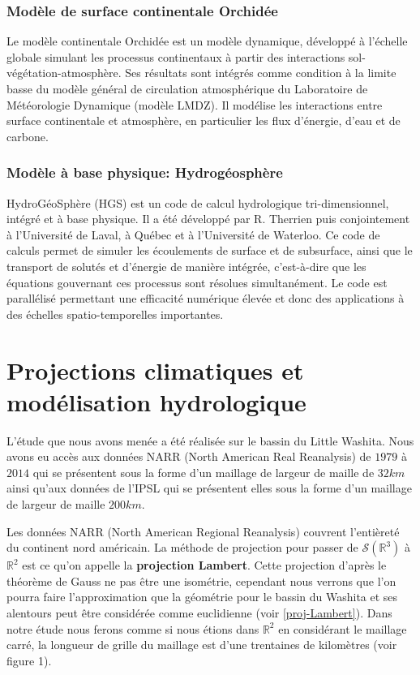 \documentclass[a4paper,11pt]{article}
\begin{document}
\subsubsection{Modèle de surface continentale Orchidée}

Le modèle continentale Orchidée est un modèle dynamique, développé à l’échelle globale simulant les processus continentaux à partir des interactions sol-végétation-atmosphère. Ses résultats sont intégrés comme condition à la limite basse du modèle général de circulation atmosphérique du Laboratoire de Météorologie Dynamique (modèle LMDZ). Il modélise les interactions entre surface continentale et atmosphère, en particulier les flux d'énergie, d'eau et de carbone. 



\subsubsection{Modèle à base physique: Hydrogéosphère}

HydroGéoSphère (HGS) est un code de calcul hydrologique tri-dimensionnel, intégré et à base physique. Il a été développé par R. Therrien puis conjointement à l’Université de Laval, à Québec et à l’Université de Waterloo. Ce code de calculs permet de simuler les écoulements de surface et de subsurface, ainsi que le transport de solutés et d’énergie de manière intégrée, c’est-à-dire que les équations gouvernant ces processus sont résolues simultanément. Le code est parallélisé permettant une efficacité numérique élevée et donc des applications à des échelles spatio-temporelles importantes.



\section{Projections climatiques et modélisation hydrologique}
\label{ch-pred-cli}
L'étude que nous avons menée a été réalisée sur le bassin du Little Washita. Nous avons eu accès aux données NARR (North American Real Reanalysis) de $1979$ à $2014$ qui se présentent sous la forme d'un maillage de largeur de maille de $32 km$ ainsi qu'aux données de l'IPSL qui se présentent elles sous la forme d'un maillage de largeur de maille $200 km$.

Les données NARR (North American Regional Reanalysis) couvrent l'entièreté du continent nord américain. La méthode de projection pour passer de $\mathcal{S}(\mathbb{R}^3)$ à $\mathbb{R}^2$ est ce qu'on appelle la \textbf{projection Lambert}. Cette projection d'après le théorème de Gauss ne pas être une isométrie, cependant nous verrons que l'on pourra faire l'approximation que la géométrie pour le bassin du Washita et ses alentours peut être considérée comme euclidienne (voir \ref{proj-Lambert}). Dans notre étude nous ferons comme si nous étions dans $\mathbb{R}^2$ en considérant le maillage carré, la longueur de grille du maillage est d'une trentaines de kilomètres (voir figure 1).
\end{document}
